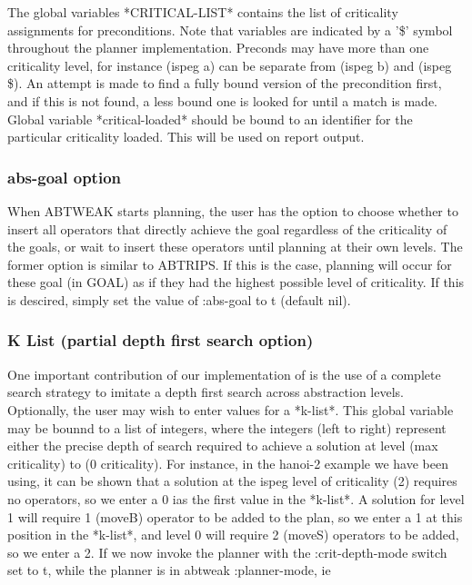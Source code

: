 The global variables *CRITICAL-LIST* contains the list of criticality
assignments for preconditions.  Note that variables are indicated by a
'\$' symbol throughout the planner implementation.  Preconds may have
more than one criticality level, for instance (ispeg a) can be
separate from (ispeg b) and (ispeg \$).  An attempt is made to find a
fully bound version of the precondition first, and if this is not
found, a less bound one is looked for until a match is made.  Global
variable *critical-loaded* should be bound to an identifier for the
particular criticality loaded.  This will be used on report output.


\subsubsection{abs-goal option}
When ABTWEAK starts planning, the user has the option to choose whether to insert all operators that directly achieve the goal regardless of the criticality of the goals, or wait to insert these operators until planning at their own levels.  The former option is similar to ABTRIPS.
 If this is the case, planning will
occur for these goal (in GOAL) as if they had the highest possible level of
criticality.  If this is descired, simply set the value of :abs-goal to t
(default nil).

\subsubsection{K List (partial depth first search option)}
One important contribution of our implementation of \abtweak is the use of a complete search strategy to imitate a depth first search across abstraction levels.  Optionally, the user may wish to enter values for 
a *k-list*.  This
global variable may be bounnd to a list of integers, where the integers (left
to right) represent either the precise depth of search required to achieve a
solution at level (max criticality) to (0 criticality).  For instance, in the
hanoi-2 example we have been using, it can be shown that a solution at the
ispeg level of criticality (2) requires no operators, so we enter a 0 ias the
first value in the *k-list*.  A solution for level 1 will require 1 (moveB)
operator to be added to the plan, so we enter a 1 at this position in the
*k-list*, and level 0 will require 2 (moveS) operators to be added, so we enter
a 2.  If we now invoke the planner with the :crit-depth-mode switch set to t,
while the planner is in abtweak :planner-mode, ie

